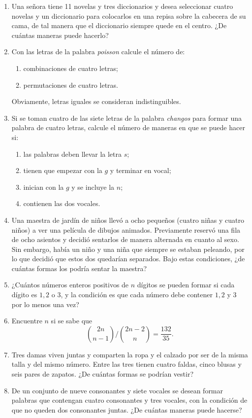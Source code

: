 \begin{Ejer}
\begin{enumerate}
\item Una se\~nora tiene 11 novelas y tres diccionarios y desea seleccionar cuatro novelas y un diccionario para colocarlos en una repisa sobre la cabecera de su cama, de tal manera que el diccionario siempre quede en el centro. ¿De cu\'antas maneras puede hacerlo?

\item Con las letras de la palabra \textit{poisson} calcule el n\'umero de:
\begin{enumerate}
\item combinaciones de cuatro letras;
\item permutaciones de cuatro letras.
\end{enumerate}
Obviamente, letras iguales se consideran indistinguibles.

\item Si se toman cuatro de las siete letras de la palabra \textit{changos} para formar una palabra de cuatro letras, calcule el n\'umero de maneras en que se puede hacer si:
\begin{enumerate}
\item las palabras deben llevar la letra $s$;
\item tienen que empezar con la $g$ y terminar en vocal;
\item inician con la $g$ y se incluye la $n$;
\item contienen las dos vocales.
\end{enumerate}

\item Una maestra de jard\'in de ni\~nos llev\'o a ocho peque\~nos (cuatro ni\~nas y cuatro ni\~nos) a ver una pel\'icula de dibujos animados. Previamente reserv\'o una fila de ocho asientos y decidi\'o sentarlos de manera alternada en cuanto al sexo. Sin embargo, hab\'ia un ni\~no y una ni\~na que siempre se estaban peleando, por lo que decidi\'o que estos dos quedar\'ian separados. Bajo estas condiciones, ¿de cu\'antas formas los podr\'ia sentar la maestra?

\item ¿Cu\'antos n\'umeros enteros positivos de $n$ d\'igitos se pueden formar si cada d\'igito es $1,2$ o $3$, y la condici\'on es que cada n\'umero debe contener $1,2$ y $3$ por lo menos una vez?

\item Encuentre $n$ si se sabe que
\[
\binom{2n}{n-1}\Big/\binom{2n-2}{n}=\frac{132}{35}.
\]

\item Tres damas viven juntas y comparten la ropa y el calzado por ser de la misma talla y del mismo n\'umero. Entre las tres tienen cuatro faldas, cinco blusas y seis pares de zapatos. ¿De cu\'antas formas se podr\'ian vestir?

\item De un conjunto de nueve consonantes y siete vocales se desean formar palabras que contengan cuatro consonantes y tres vocales, con la condici\'on de que no queden dos consonantes juntas. ¿De cu\'antas maneras puede hacerse?

\end{enumerate}
\end{Ejer}

